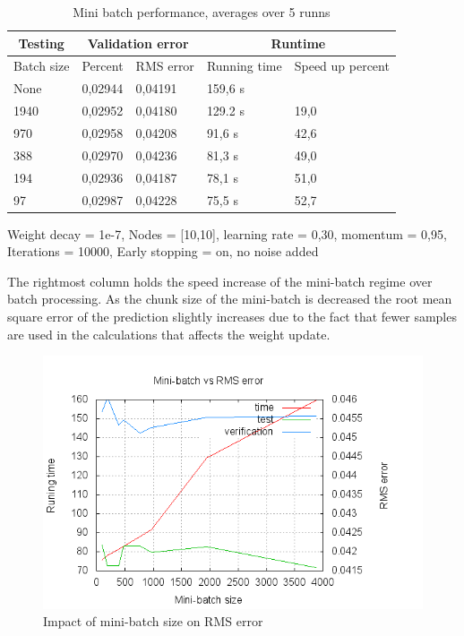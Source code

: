 \begin{table}[H]
\begin{threeparttable}
\begin{tabular}{ | l | l | l | l | l | } 
\hline
\multicolumn{1}{|c|}{Testing} & \multicolumn{2}{|c|}{Validation error}  & \multicolumn{2}{|c|}{Runtime} \\
\hline 
Batch size & Percent & RMS error & Running time & Speed up percent\\
\hline
None & 0,02944 & 0,04191 & 159,6 s &  \\
\hline
1940 & 0,02952 & 0,04180 & 129.2 s & 19,0 \\
\hline
970 & 0,02958 & 0,04208 & 91,6 s & 42,6 \\
\hline
388 & 0,02970 & 0,04236 & 81,3 s & 49,0 \\
\hline
194 & 0,02936 & 0,04187 & 78,1 s & 51,0 \\
\hline
97 & 0,02987 & 0,04228 & 75,5 s & 52,7 \\  
\hline
\end{tabular}
\begin{tablenotes}
      \small
      \item Weight decay = 1e-7, Nodes = [10,10], learning rate = 0,30, momentum = 0,95, Iterations = 10000, Early stopping = on, no noise added 
\end{tablenotes}
\caption{Mini batch performance, averages over 5 runns}
\label{tab:mini_batch1}
\end{threeparttable}
\end{table}
The rightmost column holds the speed increase of the mini-batch regime over batch processing. As the chunk size of the mini-batch is decreased the root mean square error of the prediction slightly increases due to the fact that fewer samples are used in the calculations that affects the weight update.  

\begin{figure}
\vspace{-20pt}
\begin{center}
\includegraphics[scale=0.42]{eval25a.png}
\end{center}
\vspace{-20pt}
\caption{Impact of mini-batch size on RMS error}
\label{minibarch_rmsgraph}
\end{figure}

